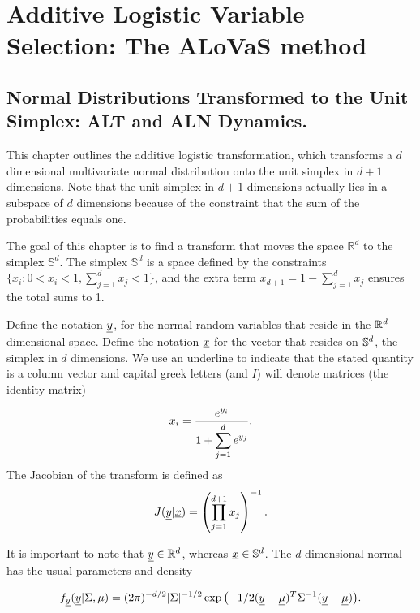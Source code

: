 \section{Additive Logistic Variable Selection: The ALoVaS method}

\subsection{Normal Distributions Transformed to the Unit Simplex: ALT and ALN Dynamics. }\label{sec:ALN_chapter}

This chapter outlines the additive logistic transformation, which transforms a $d$ dimensional multivariate normal distribution onto the unit simplex in $d+1$ dimensions. Note that the unit simplex in $d+1$ dimensions actually lies in a subspace of $d$ dimensions because of the constraint that the sum of the probabilities equals one. 

The goal of this chapter is to find a transform that moves the space $\mathbb{R}^d$  to the simplex $\mathbb{S}^d$.  The simplex $\mathbb{S}^d$ is a space defined by the constraints $\{x_i: 0<x_i<1, \sum_{j=1}^dx_j <1 \}$, and the extra term $x_{d+1}=1-\sum_{j=1}^d x_j$ ensures the total sums to 1.  

Define the notation $\underline{y}$, for the normal random variables that reside in the $\mathbb{R}^{d}$  dimensional space. Define the notation $\underline{x}$  for the vector that resides on $\mathbb{S}^{d}$, the simplex in $d$ dimensions. We use an underline to indicate that the stated quantity is a column vector and capital greek letters (and $I$) will denote matrices (the identity matrix) 

\begin{equation}\label{eqn:simplex_transform}
x_i = \frac{e^{y_i}}{1+\displaystyle{\sum_{j=1}^de^{y_j}}}. \\
\end{equation}
The Jacobian of the transform is defined as
\begin{equation}\label{eqn:jacobian}
J(\underline{y} \vert \underline{x}) = \left( \prod_{j=1}^{d+1}x_j \right)^{-1}.
\end{equation}

It is important to note that $\underline{y}\in\mathbb{R}^{d}$, whereas $\underline{x}\in\mathbb{S}^{d}$. The $d$ dimensional normal has the usual parameters and density

\begin{equation}\label{eqn:multinormal}
f_{\underline{y}}(\underline{y}\vert \Sigma, \mu)=(2\pi)^{-d/2}|\Sigma|^{-1/2}\exp{\left(-1/2(\underline{y}-\underline{\mu})^T\Sigma^{-1}(\underline{y}-\underline{\mu})\right)}.
\end{equation}

